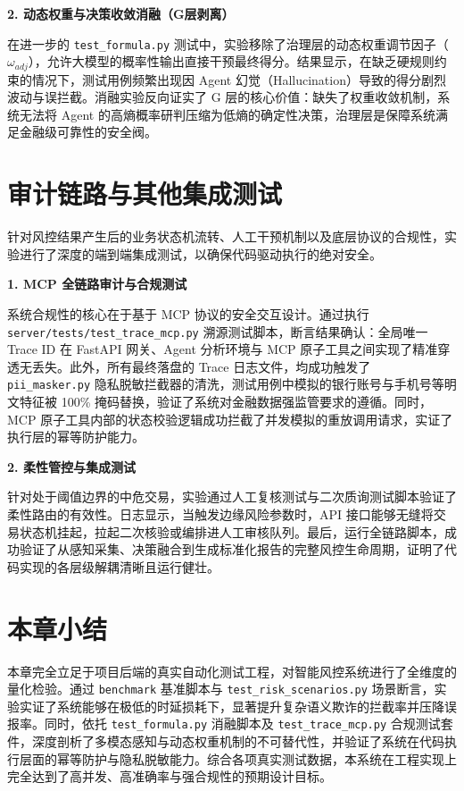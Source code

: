 \documentclass{xduugthesis}
\begin{document}
\textbf{2. 动态权重与决策收敛消融（G层剥离）}

在进一步的 \texttt{test\_formula.py} 测试中，实验移除了治理层的动态权重调节因子（$\omega_{adj}$），允许大模型的概率性输出直接干预最终得分。结果显示，在缺乏硬规则约束的情况下，测试用例频繁出现因 Agent 幻觉（Hallucination）导致的得分剧烈波动与误拦截。消融实验反向证实了 G 层的核心价值：缺失了权重收敛机制，系统无法将 Agent 的高熵概率研判压缩为低熵的确定性决策，治理层是保障系统满足金融级可靠性的安全阀。

\section{审计链路与其他集成测试}

针对风控结果产生后的业务状态机流转、人工干预机制以及底层协议的合规性，实验进行了深度的端到端集成测试，以确保代码驱动执行的绝对安全。

\textbf{1. MCP 全链路审计与合规测试}

系统合规性的核心在于基于 MCP 协议的安全交互设计。通过执行 \texttt{server/tests/test\_trace\_mcp.py} 溯源测试脚本，断言结果确认：全局唯一 Trace ID 在 FastAPI 网关、Agent 分析环境与 MCP 原子工具之间实现了精准穿透无丢失。此外，所有最终落盘的 Trace 日志文件，均成功触发了 \texttt{pii\_masker.py} 隐私脱敏拦截器的清洗，测试用例中模拟的银行账号与手机号等明文特征被 100\% 掩码替换，验证了系统对金融数据强监管要求的遵循。同时，MCP 原子工具内部的状态校验逻辑成功拦截了并发模拟的重放调用请求，实证了执行层的幂等防护能力。

\textbf{2. 柔性管控与集成测试}

针对处于阈值边界的中危交易，实验通过人工复核测试与二次质询测试脚本验证了柔性路由的有效性。日志显示，当触发边缘风险参数时，API 接口能够无缝将交易状态机挂起，拉起二次核验或编排进人工审核队列。最后，运行全链路脚本，成功验证了从感知采集、决策融合到生成标准化报告的完整风控生命周期，证明了代码实现的各层级解耦清晰且运行健壮。

\section{本章小结}

本章完全立足于项目后端的真实自动化测试工程，对智能风控系统进行了全维度的量化检验。通过 \texttt{benchmark} 基准脚本与 \texttt{test\_risk\_scenarios.py} 场景断言，实验实证了系统能够在极低的时延损耗下，显著提升复杂语义欺诈的拦截率并压降误报率。同时，依托 \texttt{test\_formula.py} 消融脚本及 \texttt{test\_trace\_mcp.py} 合规测试套件，深度剖析了多模态感知与动态权重机制的不可替代性，并验证了系统在代码执行层面的幂等防护与隐私脱敏能力。综合各项真实测试数据，本系统在工程实现上完全达到了高并发、高准确率与强合规性的预期设计目标。
\end{document}
